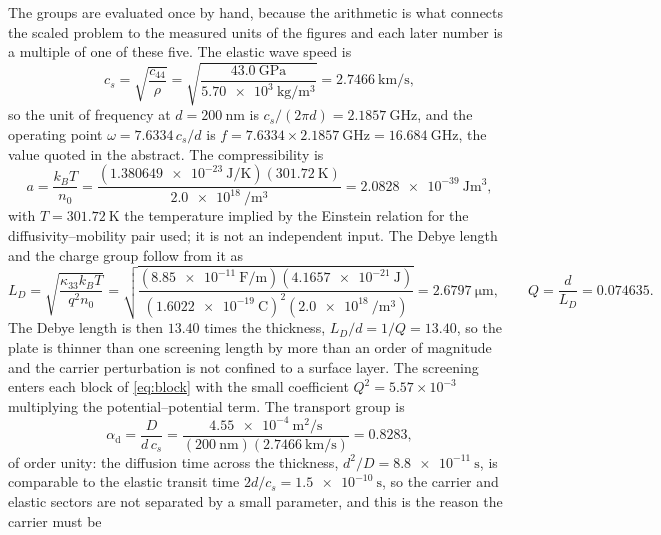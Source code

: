 The groups are evaluated once by hand, because the arithmetic is what
connects the scaled problem to the measured units of the figures and each later number is a multiple of one of these five.  The elastic wave speed is
\begin{equation}
\label{eq:cs_worked}
c_s=\sqrt{\frac{c_{44}}{\rho}}
=\sqrt{\frac{\SI{43.0}{\giga\pascal}}{\SI{5.70e3}{\kilo\gram\per\cubic\metre}}}
=\SI{2.7466}{\kilo\metre\per\second},
\end{equation}
so the unit of frequency at $d=\SI{200}{\nano\metre}$ is
$c_s/(2\pi d)=\SI{2.1857}{\giga\hertz}$, and the operating point
$\omega=7.6334\,c_s/d$ is $f=7.6334\times\SI{2.1857}{\giga\hertz}=
\SI{16.684}{\giga\hertz}$, the value quoted in the abstract.  The
compressibility is
\begin{equation}
\label{eq:a_worked}
a=\frac{k_BT}{n_0}=\frac{(\SI{1.380649e-23}{\joule\per\kelvin})
(\SI{301.72}{\kelvin})}{\SI{2.0e18}{\per\cubic\metre}}
=\SI{2.0828e-39}{\joule\metre^{3}},
\end{equation}
with $T=\SI{301.72}{\kelvin}$ the temperature implied by the Einstein relation for
the diffusivity--mobility pair used; it is not an independent input.  The
Debye length and the charge group follow from it as
\begin{equation}
\label{eq:LD_worked}
L_D=\sqrt{\frac{\kappa_{33}k_BT}{q^{2}n_0}}
=\sqrt{\frac{(\SI{8.85e-11}{\farad\per\metre})(\SI{4.1657e-21}{\joule})}
{(\SI{1.6022e-19}{\coulomb})^{2}(\SI{2.0e18}{\per\cubic\metre})}}
=\SI{2.6797}{\micro\metre},
\qquad
Q=\frac{d}{L_D}=0.074635 .
\end{equation}
The Debye length is then $13.40$ times the thickness, $L_D/d=1/Q=13.40$,
so the plate is thinner than one screening length by more than an order of
magnitude and the carrier perturbation is not confined to a surface layer.  The screening enters each block of \eqref{eq:block} with the small
coefficient $Q^{2}=5.57\times10^{-3}$ multiplying the potential--potential
term.  The
transport group is
\begin{equation}
\label{eq:alphad_worked}
\alpha_{\mathrm d}=\frac{D}{d\,c_s}
=\frac{\SI{4.55e-4}{\square\metre\per\second}}
{(\SI{200}{\nano\metre})(\SI{2.7466}{\kilo\metre\per\second})}
=0.8283 ,
\end{equation}
of order unity: the diffusion time across the thickness,
$d^{2}/D=\SI{8.8e-11}{\second}$, is comparable to the elastic transit time
$2d/c_s=\SI{1.5e-10}{\second}$, so the carrier and elastic sectors are not
separated by a small parameter, and this is the reason the carrier must be
